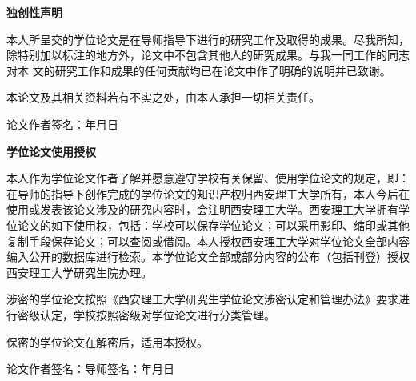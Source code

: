 
\clearpage
\pagestyle{empty}
\newpage
{}
\vspace*{20pt}
\begin{center}{\songti\bfseries 独创性声明}\end{center}
\par\vspace*{25pt}
\renewcommand{\baselinestretch}{1.5}

{ \songti \bfseries

本人所呈交的学位论文是在导师指导下进行的研究工作及取得的成果。尽我所知，除特别加以标注的地方外，论文中不包含其他人的研究成果。与我一同工作的同志对本 文的研究工作和成果的任何贡献均已在论文中作了明确的说明并已致谢。

本论文及其相关资料若有不实之处，由本人承担一切相关责任。

\vspace*{25pt}
\begin{flushright}
论文作者签名：\underline{\hspace{2.3cm}}\hspace{2cm}年\hspace{0.8cm}月\hspace{0.8cm}日
\end{flushright}


\vspace*{88pt}
\begin{center}{\songti\bfseries 学位论文使用授权}\end{center}
\par\vspace*{34pt}

 \songti %

本人作为学位论文作者了解并愿意遵守学校有关保留、使用学位论文的规定，即：在导师的指导下创作完成的学位论文的知识产权归西安理工大学所有，本人今后在使用或发表该论文涉及的研究内容时，会注明西安理工大学。西安理工大学拥有学位论文的如下使用权，包括：学校可以保存学位论文；可以采用影印、缩印或其他复制手段保存论文；可以查阅或借阅。本人授权西安理工大学对学位论文全部内容编入公开的数据库进行检索。本学位论文全部或部分内容的公布（包括刊登）授权西安理工大学研究生院办理。
\vspace*{15pt}

涉密的学位论文按照《西安理工大学研究生学位论文涉密认定和管理办法》要求进行密级认定，学校按照密级对学位论文进行分类管理。

保密的学位论文在解密后，适用本授权。

\vspace*{42pt}

\begin{flushright}
论文作者签名：\underline{\hspace{2cm}}\hspace{1cm}导师签名：\underline{\hspace{2cm}}\hspace{2cm}年\hspace{0.8cm}月\hspace{0.8cm}日
\end{flushright}
}
\cleardoublepage %
\restoregeometry %
